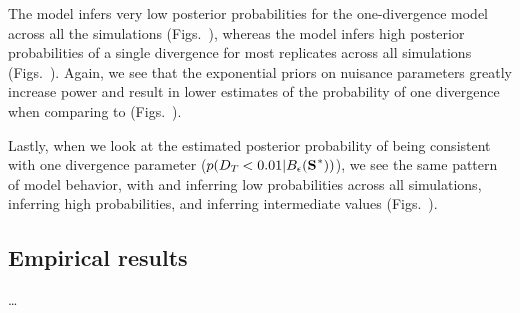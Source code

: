 The \modelUniform model infers very low posterior probabilities for the
one-divergence model across all the simulations (Figs.\
),
whereas the \modelOld model infers high posterior probabilities of a single
divergence for most replicates across all simulations (Figs.\
).
Again, we see that the exponential priors on nuisance parameters greatly
increase power and result in lower estimates of the probability of
one divergence when comparing \modelUshaped to \modelOld (Figs.\
).

Lastly, when we look at the estimated posterior probability of
\divTimeDispersion being consistent with one divergence parameter
($p(\divTimeDispersion < 0.01 | \ssSpace)$), we see the same pattern of model
behavior, with \modelDPP and \modelUniform inferring low probabilities across
all simulations, \modelOld inferring high probabilities, and \modelUshaped
inferring intermediate values (Figs.\
).

\subsection*{Empirical results}
\ldots

